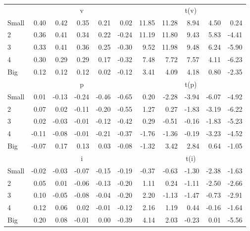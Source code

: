\begin{table}[!ht]
\begin{tabular}{lrrrrrrrrrr}
  
    
      & \multicolumn{5}{c}{v} & \multicolumn{5}{c}{t(v)}
    
    \\
      \cmidrule(r){2-6} \cmidrule(r){7-11}

    Small   & 0.40  & 0.42  & 0.35  & 0.21  & 0.02  & 11.85  & 11.28  & 8.94  & 4.50  & 0.24  \\
         2  & 0.36  & 0.41  & 0.34  & 0.22  & -0.24  & 11.19  & 11.80  & 9.43  & 5.83  & -4.41  \\
         3  & 0.33  & 0.41  & 0.36  & 0.25  & -0.30  & 9.52  & 11.98  & 9.48  & 6.24  & -5.90  \\
         4  & 0.30  & 0.29  & 0.29  & 0.17  & -0.32  & 7.48  & 7.72  & 7.57  & 4.11  & -6.23  \\
    Big     & 0.12  & 0.12  & 0.12  & 0.02  & -0.12  & 3.41  & 4.09  & 4.18  & 0.80  & -2.35  \\

  
    
      & \multicolumn{5}{c}{p} & \multicolumn{5}{c}{t(p)}
    
    \\
      \cmidrule(r){2-6} \cmidrule(r){7-11}

    Small   & 0.01  & -0.13  & -0.24  & -0.46  & -0.65  & 0.20  & -2.28  & -3.94  & -6.07  & -4.92  \\
         2  & 0.07  & 0.02  & -0.11  & -0.20  & -0.55  & 1.27  & 0.27  & -1.83  & -3.19  & -6.22  \\
         3  & 0.02  & -0.03  & -0.01  & -0.12  & -0.42  & 0.29  & -0.51  & -0.16  & -1.83  & -5.23  \\
         4  & -0.11  & -0.08  & -0.01  & -0.21  & -0.37  & -1.76  & -1.36  & -0.19  & -3.23  & -4.52  \\
    Big     & -0.07  & 0.17  & 0.13  & 0.03  & -0.08  & -1.32  & 3.42  & 2.84  & 0.64  & -1.05  \\

  
    
      & \multicolumn{5}{c}{i} & \multicolumn{5}{c}{t(i)}
    
    \\
      \cmidrule(r){2-6} \cmidrule(r){7-11}

    Small   & -0.02  & -0.03  & -0.07  & -0.15  & -0.19  & -0.37  & -0.63  & -1.30  & -2.38  & -1.63  \\
         2  & 0.05  & 0.01  & -0.06  & -0.13  & -0.20  & 1.11  & 0.24  & -1.11  & -2.50  & -2.66  \\
         3  & 0.10  & -0.05  & -0.08  & -0.04  & -0.20  & 2.20  & -1.13  & -1.47  & -0.73  & -2.91  \\
         4  & 0.12  & 0.06  & 0.02  & -0.01  & -0.12  & 2.16  & 1.19  & 0.44  & -0.16  & -1.64  \\
    Big     & 0.20  & 0.08  & -0.01  & 0.00  & -0.39  & 4.14  & 2.03  & -0.23  & 0.01  & -5.56  \\


  \bottomrule
\end{tabular}
\label{tbl:25_Size_Var_B2016}
\end{table}